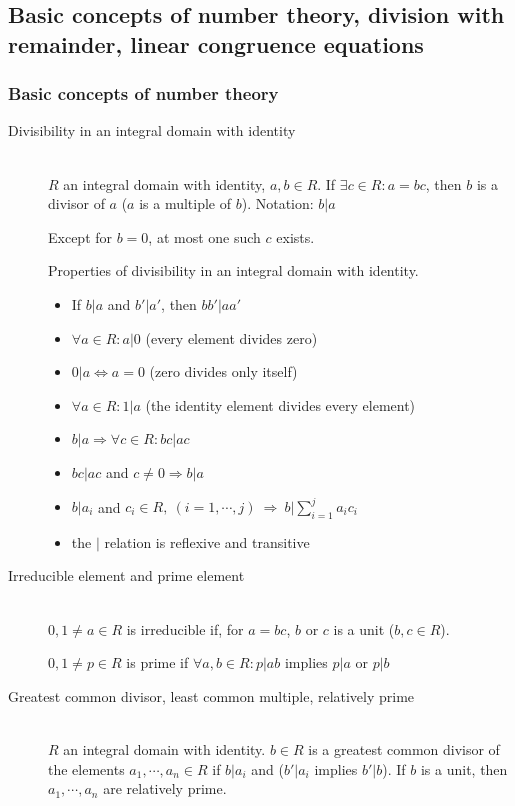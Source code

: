 \documentclass[margin=0px]{article}
\begin{document}
\subsection{Basic concepts of number theory, division with remainder, linear congruence equations}
\subsubsection{Basic concepts of number theory}
\begin{description}
    \item[Divisibility in an integral domain with identity] \hfill \\
        $R$ an integral domain with identity, $a,b\in R$. If $\exists c\in R: a = bc$, then $b$ is a divisor of $a$ ($a$ is a multiple of $b$). Notation: $b|a$

        Except for $b = 0$, at most one such $c$ exists.

        Properties of divisibility in an integral domain with identity.
        \begin{itemize}
            \item If $b|a$ and $b'|a'$, then $bb'|aa'$
            \item $\forall a\in R: a|0$ (every element divides zero)
            \item $0|a \Leftrightarrow a = 0$ (zero divides only itself)
            \item $\forall a\in R: 1|a$ (the identity element divides every element)
            \item $b|a \Rightarrow \forall c \in R : bc|ac$
            \item $bc|ac$ and $c\neq0 \Rightarrow b|a$
            \item $b|a_i$ and $c_i \in R,\ (i = 1,\cdots,j) \ \Rightarrow \ b|\sum_{i=1}^{j}a_ic_i$
            \item the $|$ relation is reflexive and transitive
        \end{itemize}
    \item[Irreducible element and prime element] \hfill \\
        $0,1 \neq a \in R$ is irreducible if, for $a = bc$, $b$ or $c$ is a unit ($b,c \in R$).

        $0,1 \neq p \in R$ is prime if $\forall a,b \in R : p|ab$ implies $p|a$ or $p|b$
    \item[Greatest common divisor, least common multiple, relatively prime] \hfill \\
        $R$ an integral domain with identity. $b\in R$ is a greatest common divisor of the elements $a_1,\cdots,a_n \in R$ if $b|a_i$ and ($b'|a_i$ implies $b'|b$). If $b$ is a unit, then $a_1, \cdots , a_n$ are relatively prime.


\end{description}
\end{document}
